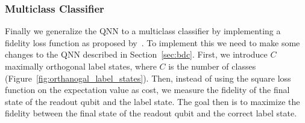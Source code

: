 \documentclass[a4paper,10pt]{article}
\begin{document}
\subsubsection{Multiclass Classifier}
Finally we generalize the QNN to a multiclass classifier by implementing a fidelity loss function as proposed by~\cite{perez2019data}.
To implement this we need to make some changes to the QNN described in Section~\ref{sec:bdc}.
First, we introduce $C$ maximally orthogonal label states, where $C$ is the number of classes (Figure~\ref{fig:orthanogal_label_states}).
Then, instead of using the square loss function on the expectation value as cost, we measure the fidelity of the final state of the readout qubit and the label state.
The goal then is to maximize the fidelity between the final state of the readout qubit and the correct label state.
\end{document}
